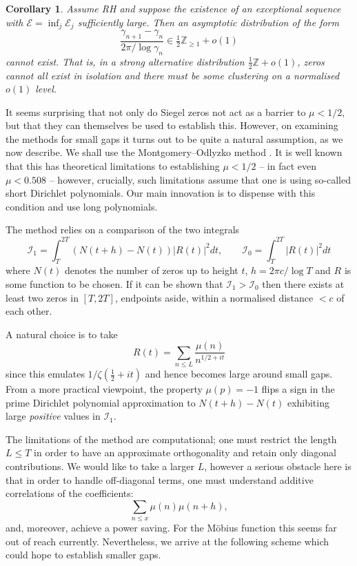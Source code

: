 \documentclass[12pt, oneside]{amsart}
\newtheorem{cor}[thm]{Corollary}
\theoremstyle{definition}
\newcommand{\mb}{\mathbb}
\newcommand{\mc}{\mathcal}
\newcommand{\leqs}{\leqslant }
\newcommand{\geqs}{\geqslant }
\newcommand{\1}{\mathds{1}}
\begin{document}
\begin{cor}Assume RH and suppose the existence of an exceptional sequence with $\mc{E}=\inf_j \mc{E}_j$ sufficiently large. Then an asymptotic distribution of the form 
\[
\frac{\gamma_{n+1}-\gamma_n}{2\pi/\log \gamma_n}\in \tfrac12 \mb{Z}_{\geqs 1}+o(1)
\] 
cannot exist. That is, in a strong alternative distribution $\tfrac12\mb{Z}+o(1)$, zeros cannot all exist in isolation and there must be some clustering on a normalised $o(1)$ level. 
\end{cor}

It seems surprising that not only do Siegel zeros not act as a barrier to $\mu<1/2$, but that they can themselves be used to establish this. However, on examining the methods for small gaps it turns out to be quite a natural assumption, as we now describe. We shall use the Montgomery--Odlyzko method \cite{MontgomeryOdlyzko}. It is well known that this has theoretical limitations to establishing $\mu<1/2$ -- in fact even $\mu<0.508$ \cite{IKT} -- however, crucially, such limitations assume that one is using so-called short Dirichlet polynomials. Our main innovation is to dispense with this condition and use long polynomials. 

The method relies on a comparison of the two integrals 
\[
\mc{I}_1=\int_T^{2T} (N(t+h)-N(t))|R(t)|^2dt, \qquad
\mc{I}_0=\int_T^{2T} |R(t)|^2dt
\]
where $N(t)$ denotes the number of zeros up to height $t$, $h=2\pi c/\log T$ and $R$ is some function to be chosen. If it can be shown that $\mc{I}_1>\mc{I}_0$ then there exists at least two zeros in $[T,2T]$, endpoints aside, within a normalised distance $<c$ of each other.  

A natural choice is to take 
\[
R(t)=\sum_{n\leqs L}\frac{\mu(n)}{n^{1/2+it}}
\] since this emulates $1/\zeta(\tfrac12+it)$ and hence becomes large around small gaps. From a more practical viewpoint, the property $\mu(p)=-1$ flips a sign in the prime Dirichlet polynomial approximation to $N(t+h)-N(t)$ exhibiting large \emph{positive} values in $\mc{I}_1$.  

The limitations of the method are computational; one must restrict the length $L\leqs T$ in order to have an approximate orthogonality and retain only diagonal contributions. 
We would like to take a larger $L$, however a serious obstacle here is that in order to handle off-diagonal terms, one must understand additive correlations of the coefficients:
\[
\sum_{n\leqs x}\mu(n)\mu(n+h),
\] 
and, moreover, achieve a power saving. For the M\"obius function this seems far out of reach currently. Nevertheless, we arrive at the following scheme which could hope to establish smaller gaps. 
\end{document}
